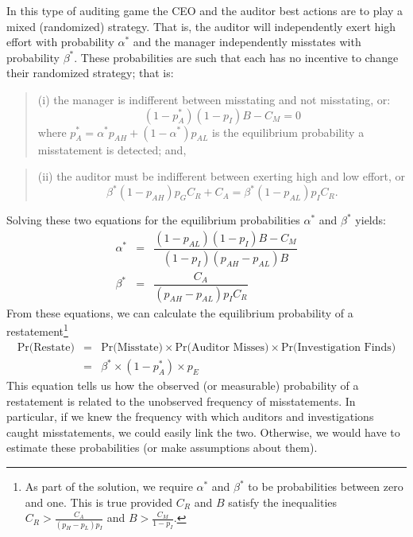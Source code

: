 In this type of auditing game the CEO and the auditor best actions are to play a mixed (randomized) strategy. %
That is, the auditor will independently exert high effort with probability $\alpha^*$ 
and the manager independently misstates with probability $\beta^*$. 
These probabilities 
are such that each has no incentive to change their randomized strategy; that is:\\
\begin{quote}
(i) the manager is indifferent between misstating and not misstating, or:\\
\begin{equation}\label{manager}
(1 - p_A^*)(1 - p_I) B - C_M = 0 
\end{equation}
where $p_A^* = \alpha^* p_{AH }+ (1-\alpha^*) p_{AL}$ is the equilibrium 
probability a misstatement is detected; and,\\
\end{quote}
\begin{quote} (ii) the auditor must be
indifferent between exerting high and low effort, or\\
$$ \beta^* (1-p_{AH}) p_G C_R + C_A = \beta^* (1-p_{AL}) p_I C_R .$$
\end{quote}

Solving these two equations for the equilibrium probabilities $\alpha^*$ and $\beta^*$
yields:
\begin{equation}\label{equilstrat}
\begin{array}{lcl}
  \alpha^* &= & \dfrac{ ( 1 - p_{AL}) (1 - p_I) B- C_M}{ (1 - p_I) (p_{AH}-p_{AL}) B}\\[1.5em]
  \beta^* &= & \dfrac{C_A}{(p_{AH}-p_{AL}) p_I C_R}  
\end{array}
\end{equation}
From these equations, we can calculate the equilibrium probability of a restatement\footnote{
As part of the solution, we require $\alpha^*$ and $\beta^*$ to be probabilities between
zero and one. 
This is true provided $C_R$ and $B$ satisfy the inequalities
$ C_R > \frac{C_A}{(p_H-p_L)p_I} $
and 
$ B > \frac{C_M}{1 - p_I}  $.}
\begin{equation} \label{equilpr1}
\begin{array}{lcl}
\mbox{Pr(Restate)} & = &  \mbox{Pr(Misstate)} \times \mbox{Pr(Auditor Misses)} \times
\mbox{Pr(Investigation Finds)}\\[1em]
& = & \beta^* \times (1-p_A^*) \times p_{E}
\end{array}\end{equation}
This equation tells us how the observed (or measurable) probability of a restatement is related to
the unobserved frequency of misstatements. In particular, if we knew the frequency with which auditors and investigations caught misstatements, we could easily link the two. Otherwise,
we would have to estimate these probabilities (or make assumptions about them).

